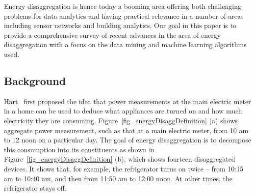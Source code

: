 Energy disaggregation is hence today a booming area offering both
challenging problems for data analytics and having practical relevance in a
number of areas including sensor networks and building analytics.
Our goal in this paper is to provide a comprehensive survey of recent
advances in the area of energy disaggregation with a focus on the data mining
and machine learning algorithms used. 


\subsection {Background}

Hart~\cite{hart1992} first proposed the idea that power measurements at the
main electric meter in a home can be used to deduce what appliances are
turned on and how much electricity they are consuming.
Figure~\ref{fig_energyDisaggDefinition} (a) shows aggregate power measurement,
such as that at a main electric meter, from 10 am to 12 noon on a particular
day. The goal of energy disaggregation is to decompose this consumption into
its constituents as shown in Figure~\ref{fig_energyDisaggDefinition} (b),
which shows fourteen disaggregated devices. It shows that, for example, the
refrigerator turns on twice -- from 10:15 am to 10:40 am, and then from 11:50
am to 12:00 noon. At other times, the refrigerator stays off.



